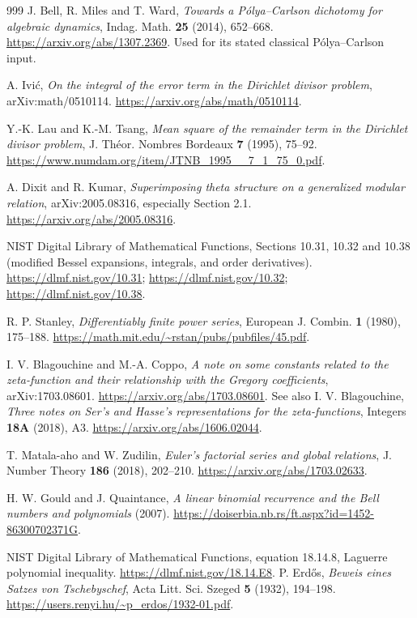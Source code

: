 \documentclass[11pt,a4paper]{article}
\theoremstyle{definition}
\theoremstyle{remark}
\numberwithin{equation}{section}
\begin{document}
\begin{thebibliography}{999}
J. Bell, R. Miles and T. Ward, \emph{Towards a P\'olya--Carlson dichotomy
for algebraic dynamics}, Indag. Math. \textbf{25} (2014), 652--668.
\url{https://arxiv.org/abs/1307.2369}. Used for its stated classical
P\'olya--Carlson input.

A. Ivi\'c, \emph{On the integral of the error term in the Dirichlet
divisor problem}, arXiv:math/0510114.
\url{https://arxiv.org/abs/math/0510114}.

Y.-K. Lau and K.-M. Tsang, \emph{Mean square of the remainder term in
the Dirichlet divisor problem}, J. Th\'eor. Nombres Bordeaux
\textbf{7} (1995), 75--92.
\url{https://www.numdam.org/item/JTNB_1995__7_1_75_0.pdf}.

A. Dixit and R. Kumar, \emph{Superimposing theta structure on a
generalized modular relation}, arXiv:2005.08316, especially Section 2.1.
\url{https://arxiv.org/abs/2005.08316}.

NIST Digital Library of Mathematical Functions, Sections 10.31, 10.32
and 10.38 (modified Bessel expansions, integrals, and order derivatives).
\url{https://dlmf.nist.gov/10.31}; \url{https://dlmf.nist.gov/10.32};
\url{https://dlmf.nist.gov/10.38}.

R. P. Stanley, \emph{Differentiably finite power series}, European
J. Combin. \textbf{1} (1980), 175--188.
\url{https://math.mit.edu/~rstan/pubs/pubfiles/45.pdf}.

I. V. Blagouchine and M.-A. Coppo, \emph{A note on some constants related
to the zeta-function and their relationship with the Gregory
coefficients}, arXiv:1703.08601.
\url{https://arxiv.org/abs/1703.08601}.
See also I. V. Blagouchine, \emph{Three notes on Ser's and Hasse's
representations for the zeta-functions}, Integers \textbf{18A} (2018), A3.
\url{https://arxiv.org/abs/1606.02044}.

T. Matala-aho and W. Zudilin, \emph{Euler's factorial series and global
relations}, J. Number Theory \textbf{186} (2018), 202--210.
\url{https://arxiv.org/abs/1703.02633}.

H. W. Gould and J. Quaintance, \emph{A linear binomial recurrence and
the Bell numbers and polynomials} (2007).
\url{https://doiserbia.nb.rs/ft.aspx?id=1452-86300702371G}.

NIST Digital Library of Mathematical Functions, equation 18.14.8,
Laguerre polynomial inequality.
\url{https://dlmf.nist.gov/18.14.E8}.
P. Erd\H{o}s, \emph{Beweis eines Satzes von Tschebyschef}, Acta Litt. Sci. Szeged \textbf{5} (1932), 194--198.
\url{https://users.renyi.hu/~p_erdos/1932-01.pdf}.


\end{thebibliography}
\end{document}
